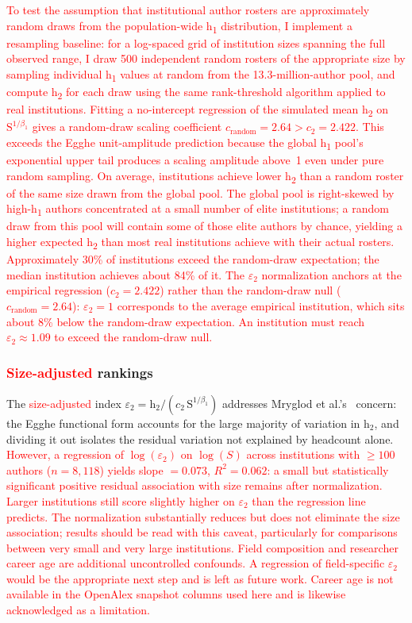 \textcolor{red}{To test the assumption that institutional author rosters are approximately random draws from the population-wide h\textsubscript{1} distribution, I implement a resampling baseline: for a log-spaced grid of institution sizes spanning the full observed range, I draw 500 independent random rosters of the appropriate size by sampling individual h\textsubscript{1} values at random from the 13.3-million-author pool, and compute h\textsubscript{2} for each draw using the same rank-threshold algorithm applied to real institutions. Fitting a no-intercept regression of the simulated mean h\textsubscript{2} on $\mathrm{S}^{1/\beta_1}$ gives a random-draw scaling coefficient $c_\text{random} = 2.64 > c_2 = 2.422$. This exceeds the Egghe unit-amplitude prediction because the global h\textsubscript{1} pool's exponential upper tail produces a scaling amplitude above~1 even under pure random sampling. On average, institutions achieve lower h\textsubscript{2} than a random roster of the same size drawn from the global pool. The global pool is right-skewed by high-h\textsubscript{1} authors concentrated at a small number of elite institutions; a random draw from this pool will contain some of those elite authors by chance, yielding a higher expected h\textsubscript{2} than most real institutions achieve with their actual rosters. Approximately 30\% of institutions exceed the random-draw expectation; the median institution achieves about 84\% of it. The $\varepsilon_2$ normalization anchors at the empirical regression ($c_2 = 2.422$) rather than the random-draw null ($c_\text{random} = 2.64$): $\varepsilon_2 = 1$ corresponds to the average empirical institution, which sits about 8\% below the random-draw expectation. An institution must reach $\varepsilon_2 \approx 1.09$ to exceed the random-draw null.}

\subsubsection*{\textcolor{red}{Size-adjusted} rankings}
The \textcolor{red}{size-adjusted} index $\varepsilon_2 = \mathrm{h}_2 / (c_2\,\mathrm{S}^{1/\beta_1})$ addresses Mryglod et al.'s~\citeyearpar{mryglod2022} concern: the Egghe functional form accounts for the large majority of variation in $\mathrm{h}_2$, and dividing it out isolates the residual variation not explained by headcount alone. \textcolor{red}{However, a regression of $\log(\varepsilon_2)$ on $\log(S)$ across institutions with $\geq 100$ authors ($n = 8{,}118$) yields slope $= 0.073$, $R^2 = 0.062$: a small but statistically significant positive residual association with size remains after normalization. Larger institutions still score slightly higher on $\varepsilon_2$ than the regression line predicts. The normalization substantially reduces but does not eliminate the size association; results should be read with this caveat, particularly for comparisons between very small and very large institutions. Field composition and researcher career age are additional uncontrolled confounds. A regression of field-specific $\varepsilon_2$ would be the appropriate next step and is left as future work. Career age is not available in the OpenAlex snapshot columns used here and is likewise acknowledged as a limitation.}

